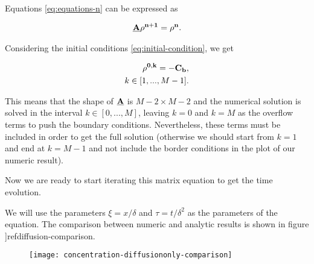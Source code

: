 Equations \ref{eq:equations-n} can be expressed as

\begin{align}
    \bf{\underline{A}} \bf{\rho^{n+1}}  = \bf{\rho^n} .
\end{align}

Considering the initial conditions \ref{eq:initial-condition}, we get

\begin{align}
    \bf{\rho^{0,k}} = -C_b, \\
    k \in [1,..., M-1].
\end{align}

This means that the shape of $\bf{\underline{A}}$ is $M-2 \times M-2$ and the numerical solution is solved in the interval  $k \in [0,..., M]$, leaving $k=0$ and $k=M$ as the overflow terms to push the boundary conditions. Nevertheless, these terms must be included in order to get the full solution (otherwise we should start from $k=1$ and end at $k=M-1$ and not include the border conditions in the plot of our numeric result).

Now we are ready to start iterating this matrix equation to get the time evolution.

We will use the parameters $\xi = x/\delta$ and $\tau = t/\delta^2$ as the parameters of the equation. The comparison between numeric and analytic results is shown in figure ]ref{diffusion-comparison}.

\begin{figure}[htbp]
\centering
\texttt{[image: concentration-diffusiononly-comparison]}
\caption{}
\label{fig:diffusion-comparison}
\end{figure}


